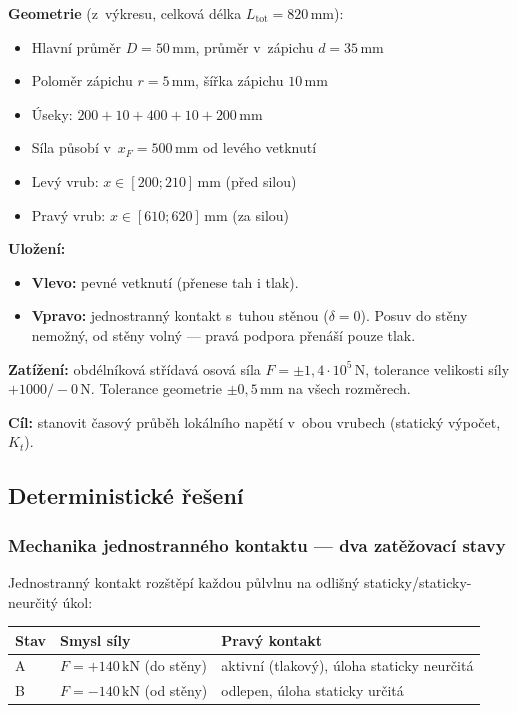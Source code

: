 \documentclass[a4paper,11pt]{article}
\newcommand{\unit}[1]{\,\mathrm{#1}}
\begin{document}
\textbf{Geometrie} (z~výkresu, celková délka $L_{\mathrm{tot}} = 820\unit{mm}$):
\begin{itemize}[nosep]
    \item Hlavní průměr $D = 50\unit{mm}$, průměr v~zápichu $d = 35\unit{mm}$
    \item Poloměr zápichu $r = 5\unit{mm}$, šířka zápichu $10\unit{mm}$
    \item Úseky: $200 + 10 + 400 + 10 + 200\unit{mm}$
    \item Síla působí v~$x_F = 500\unit{mm}$ od levého vetknutí
    \item Levý vrub: $x \in [200; 210]\unit{mm}$ (před silou)
    \item Pravý vrub: $x \in [610; 620]\unit{mm}$ (za silou)
\end{itemize}

\textbf{Uložení:}
\begin{itemize}[nosep]
    \item \textbf{Vlevo:} pevné vetknutí (přenese tah i tlak).
    \item \textbf{Vpravo:} jednostranný kontakt s~tuhou stěnou ($\delta = 0$). Posuv do stěny nemožný, od stěny volný — pravá podpora přenáší pouze tlak.
\end{itemize}

\textbf{Zatížení:} obdélníková střídavá osová síla $F = \pm 1{,}4\cdot 10^5\unit{N}$, tolerance velikosti síly $+1000/-0\unit{N}$. Tolerance geometrie $\pm 0{,}5\unit{mm}$ na všech rozměrech.

\textbf{Cíl:} stanovit časový průběh lokálního napětí v~obou vrubech (statický výpočet, $K_t$).

\subsection{Deterministické řešení}

\subsubsection{Mechanika jednostranného kontaktu — dva zatěžovací stavy}

Jednostranný kontakt rozštěpí každou půlvlnu na odlišný staticky/staticky-neurčitý úkol:

\begin{center}
\begin{tabular}{lll}
\toprule
\textbf{Stav} & \textbf{Smysl síly} & \textbf{Pravý kontakt} \\
\midrule
A & $F = +140\unit{kN}$ (do stěny) & aktivní (tlakový), úloha staticky neurčitá \\
B & $F = -140\unit{kN}$ (od stěny) & odlepen, úloha staticky určitá \\
\bottomrule
\end{tabular}
\end{center}
\end{document}
